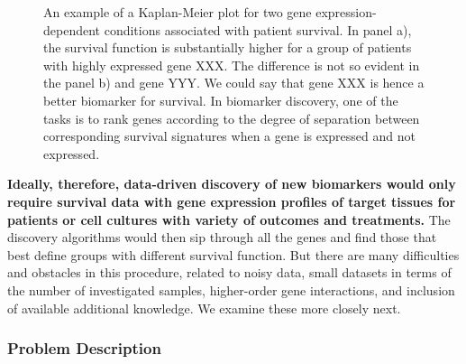 \documentclass[11pt,a4paper]{article}
\begin{document}
\begin{figure}
\caption{An example of a Kaplan-Meier plot for two gene expression-dependent conditions associated with patient survival. In panel a), the survival function is substantially higher for a group of patients with highly expressed gene XXX. The difference is not so evident in the panel b) and gene YYY. We could say that gene XXX is hence a better biomarker for survival. In biomarker discovery, one of the tasks is to rank genes according to the degree of separation between corresponding survival signatures when a gene is expressed and not expressed.}
\label{fig:km-marker}
\end{figure}

{\bf Ideally, therefore, data-driven discovery of new biomarkers would only require survival data with gene expression profiles of target tissues for patients or cell cultures with variety of outcomes and treatments.} The discovery algorithms would then sip through all the genes and find those that best define groups with different survival function. But there are many difficulties and obstacles in this procedure, related to noisy data, small datasets in terms of the number of investigated samples, higher-order gene interactions, and inclusion of available additional knowledge. We examine these more closely next.

\subsubsection*{Problem Description}
\end{document}
